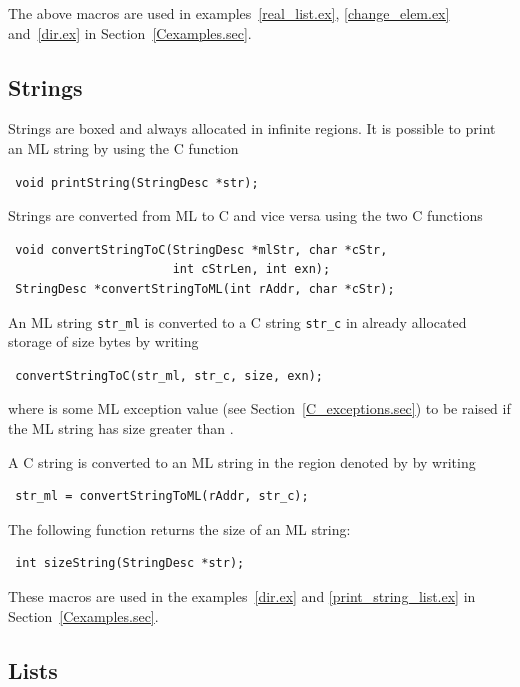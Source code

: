 \documentclass[12pt]{book}
\begin{document}
The above macros are used in examples~\ref{real_list.ex},
\ref{change_elem.ex} and~\ref{dir.ex} in Section~\ref{Cexamples.sec}.

\subsection{Strings}
Strings are boxed and always allocated in infinite regions. It is possible
to print an ML string by using the C function
%
\begin{verbatim}
 void printString(StringDesc *str);
\end{verbatim}

Strings are converted from ML to C and vice versa using the two C 
functions
%
%
\begin{verbatim}
 void convertStringToC(StringDesc *mlStr, char *cStr, 
                       int cStrLen, int exn);
 StringDesc *convertStringToML(int rAddr, char *cStr);
\end{verbatim}
An ML string \verb|str_ml| is converted to a C
string \verb|str_c| in already allocated storage of size  bytes by writing
\begin{verbatim}
 convertStringToC(str_ml, str_c, size, exn);
\end{verbatim}
where  is some ML exception value (see
Section~\ref{C_exceptions.sec}) to be raised if the ML string has size
greater than .  

A C string is converted to an ML string in the region denoted by
 by writing
\begin{verbatim}
 str_ml = convertStringToML(rAddr, str_c);
\end{verbatim}

The following function returns the size of an ML string:
%
\begin{verbatim}
 int sizeString(StringDesc *str);
\end{verbatim}

These macros are used in the examples~\ref{dir.ex} and
\ref{print_string_list.ex} in Section~\ref{Cexamples.sec}.

\subsection{Lists}
\end{document}
